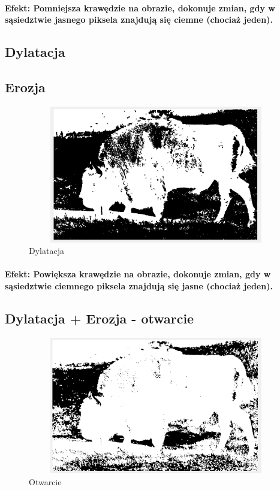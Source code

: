 \documentclass[a4paper,12pt]{article}
\begin{document}
\begin{justify}
\paragraph{Efekt: Pomniejsza krawędzie na obrazie, dokonuje zmian, gdy w sąsiedztwie jasnego piksela znajdują się ciemne (chociaż jeden).}

\newpage

\subsection{Dylatacja}

\subsection{Erozja}

\begin{figure}[h!]
\centering
\includegraphics[width=12cm, height=6cm]{12}
\caption{Dylatacja}
\end{figure}

\paragraph{Efekt: Powiększa krawędzie na obrazie, dokonuje zmian, gdy w sąsiedztwie ciemnego piksela znajdują się jasne (chociaż jeden).}

\newpage

\subsection{Dylatacja + Erozja - otwarcie}

\begin{figure}[h!]
\centering
\includegraphics[width=12cm, height=6cm]{13}
\caption{Otwarcie}
\end{figure}


\end{justify}
\end{document}

